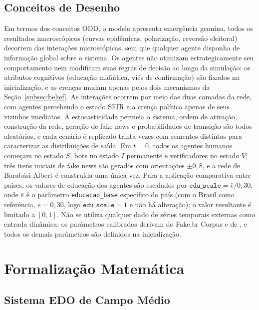\documentclass[12pt,a4paper]{article}
\theoremstyle{definition}
\theoremstyle{plain}
\begin{document}
\subsection{Conceitos de Desenho}
\label{subsec:design}

Em termos dos conceitos ODD, o modelo apresenta emergência genuína, todos os resultados macroscópicos (curvas epidêmicas, polarização, reversão eleitoral) decorrem das interações microscópicas, sem que qualquer agente disponha de informação global sobre o sistema. Os agentes não otimizam estrategicamente seu comportamento nem modificam suas regras de decisão ao longo da simulação: os atributos cognitivos (educação midiática, viés de confirmação) são fixados na inicialização, e as crenças mudam apenas pelos dois mecanismos da Seção~\ref{subsec:belief}. As interações ocorrem por meio das duas camadas da rede, com agentes percebendo o estado SEIR e a crença política apenas de seus vizinhos imediatos. A estocasticidade permeia o sistema, ordem de ativação, construção da rede, geração de fake news e probabilidades de transição são todos aleatórios, e cada cenário é replicado trinta vezes com sementes distintas para caracterizar as distribuições de saída. Em $t=0$, todos os agentes humanos começam no estado $S$, bots no estado $I$ permanente e verificadores no estado $V$; três itens iniciais de fake news são gerados com orientações $\pm 0{,}8$, e a rede de Barabási-Albert é construída uma única vez. Para a aplicação comparativa entre países, os valores de educação dos agentes são escalados por $\texttt{edu\_scale} = \bar{e}/0{,}30$, onde $\bar{e}$ é o parâmetro \texttt{educacao\_base} específico do país (com o Brasil como referência, $\bar{e} = 0{,}30$, logo $\texttt{edu\_scale} = 1$ e não há alteração); o valor resultante é limitado a $[0,1]$. Não se utiliza qualquer dado de séries temporais externas como entrada dinâmica: os parâmetros calibrados derivam do Fake.br Corpus \citep{monteiro2018fakebr} e de \citet{ruediger2018bots}, e todos os demais parâmetros são definidos na inicialização.

\section{Formalização Matemática}
\label{sec:formalization}

\subsection{Sistema EDO de Campo Médio}
\label{subsec:ode}
\end{document}
